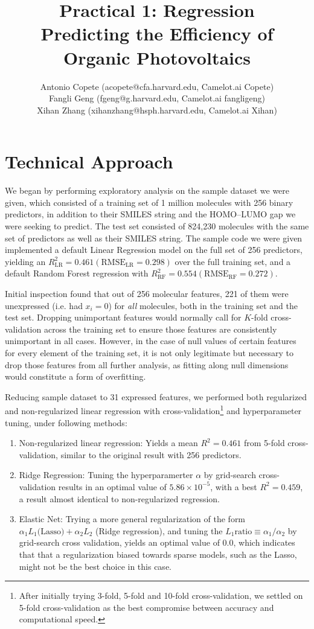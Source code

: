 \documentclass[11pt]{article}
\title{Practical 1: Regression \\ Predicting the Efficiency of Organic Photovoltaics}
\author{Antonio Copete (acopete@cfa.harvard.edu, Camelot.ai Copete) \\
	Fangli Geng (fgeng@g.harvard.edu, Camelot.ai fangligeng) \\
	Xihan Zhang (xihanzhang@hsph.harvard.edu, Camelot.ai Xihan)}
\begin{document}
\maketitle{}


\section{Technical Approach}

We began by performing exploratory analysis on the sample dataset we were given, which consisted of a training set of 1 million molecules with 256 binary predictors, in addition to their SMILES string and the HOMO--LUMO gap we were seeking to predict. The test set consisted of 824,230 molecules with the same set of predictors as well as their SMILES string. The sample code we were given implemented a default Linear Regression model on the full set of 256 predictors, yielding an $R_\textrm{LR}^2 = 0.461 (\textrm{RMSE}_\textrm{LR} = 0.298)$ over the full training set, and a default Random Forest regression with $R_\textrm{RF}^2 = 0.554 (\textrm{RMSE}_\textrm{RF} = 0.272)$.

Initial inspection found that out of 256 molecular features, 221 of them were unexpressed (i.e. had $x_i = 0$) for \emph{all} molecules, both in the training set and the test set. Dropping unimportant features would normally call for $K$-fold cross-validation across the training set to ensure those features are consistently unimportant in all cases. However, in the case of null values of certain features for every element of the training set, it is not only legitimate but necessary to drop those features from all further analysis, as fitting along null dimensions would constitute a form of overfitting.

Reducing sample dataset to 31 expressed features, we performed both regularized and non-regularized linear regression with cross-validation\footnote{After initially trying 3-fold, 5-fold and 10-fold cross-validation, we settled on 5-fold cross-validation as the best compromise between accuracy and computational speed.} and hyperparameter tuning, under following methods:

\begin{enumerate}

\item Non-regularized linear regression: Yields a mean $R^2 = 0.461$ from 5-fold cross-validation, similar to the original result with 256 predictors.
\item Ridge Regression: Tuning the hyperparamerter $\alpha$ by grid-search cross-validation results in an optimal value of $5.86 \times 10^{-5}$, with a best $R^2 = 0.459$, a result almost identical to non-regularized regression. 
\item Elastic Net: Trying a more general regularization of the form $\alpha_1 L_1 \textrm{(Lasso)} + \alpha_2 L_2$ (Ridge regression), and tuning the $L_1 \textrm{ratio} \equiv \alpha_1/\alpha_2$ by grid-search cross validation, yields an optimal value of 0.0, which indicates that that a regularization biased towards sparse models, such as the Lasso, might not be the best choice in this case.

\end{enumerate}
\end{document}
